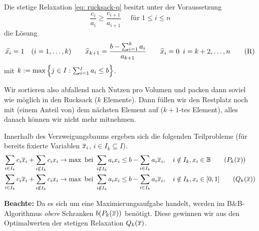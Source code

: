\begin{bemerkung}
	Die stetige Relaxation \eqref{eq: rucksack-q} besitzt unter der Voraussetzung
	\begin{equation*}
		\frac{c_i}{a_i} \ge \frac{c_{i+1}}{a_{i+1}} \quad \text{ für } 1 \le i \le n
	\end{equation*}
	die Lösung
	\begin{equation*}
		\widehat{x_i} = 1 \quad (i = 1, \dots, k) \qquad \widehat{x}_{k+1} = \frac{b - \sum_{i=1}^k a_i}{a_{k+1}} \qquad \widehat{x}_i = 0 \enskip i = k+2, \dots, n 
		\tag{R} \label{eq: rucksack-r}
	\end{equation*}
	mit $k \mathrel{:=} \max\left\{ j \in I : \sum_{i=1}^j a_i \le b \right\}$.
\end{bemerkung}

\begin{*bemerkung_inline}
	Wir sortieren also abfallend nach Nutzen pro Volumen und packen dann soviel wie möglich in den Rucksack ($k$ Elemente). Dann füllen wir den Restplatz noch mit (einem Anteil von) dem nächsten Element auf ($k+1$-tes Element), alles danach können wir nicht mehr mitnehmen.
\end{*bemerkung_inline}

Innerhalb des Verzweigungsbaums ergeben sich die folgenden Teilprobleme (für bereits fixierte Variablen $\overline{x}_i$, $i \in I_k \subseteq I$).
\begin{align*}
	\sum_{i \in I_k} c_i \quer{x}_i + \sum_{i \notin I_k} c_i x_i &\to \max \bei \sum_{i \notin I_k} a_i x_i \le b - \sum_{i \in I_k} a_i \quer{x}_i, \quad i \notin I_k, x_i \in \mathbb{B}
	\tag{$P_k(\quer{x})$} \label{eq: rucksack-pk}\\
	\sum_{i \in I_k} c_i \quer{x}_i + \sum_{i \notin I_k} c_i x_i &\to \max \bei \sum_{i \notin I_k} a_i x_i \le b - \sum_{i \in I_k} a_i \quer{x}_i, \quad i \notin I_k, x_i \in [0,1]  \tag{$Q_k(\quer{x})$} \label{eq: rucksack-qk}
\end{align*}

\textbf{Beachte:} Da es sich um eine Maximierungsaufgabe handelt, werden im B\&B-Algorithmus \textit{obere} Schranken $b(P_k(\overline{x}))$ benötigt. Diese gewinnen wir aus den Optimalwerten der stetigen Relaxation $Q_k(\overline{x})$.

